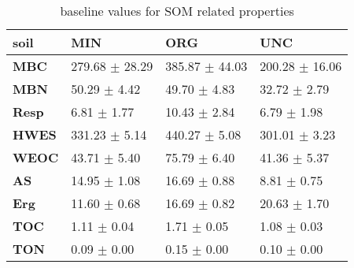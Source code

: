 \begin{table}[H]
\centering
\caption{baseline values for SOM related properties }
\label{baseline}
\begin{tabular}{llll}
\toprule
\textbf{soil} &              MIN &              ORG &              UNC \\
\midrule
\textbf{MBC } &  279.68 $ \pm $  28.29 &  385.87 $ \pm $  44.03 &  200.28 $ \pm $  16.06 \\
\textbf{MBN } &    50.29 $ \pm $  4.42 &    49.70 $ \pm $  4.83 &    32.72 $ \pm $  2.79 \\
\textbf{Resp} &     6.81 $ \pm $  1.77 &    10.43 $ \pm $  2.84 &     6.79 $ \pm $  1.98 \\
\textbf{HWES} &   331.23 $ \pm $  5.14 &   440.27 $ \pm $  5.08 &   301.01 $ \pm $  3.23 \\
\textbf{WEOC} &    43.71 $ \pm $  5.40 &    75.79 $ \pm $  6.40 &    41.36 $ \pm $  5.37 \\
\textbf{AS  } &    14.95 $ \pm $  1.08 &    16.69 $ \pm $  0.88 &     8.81 $ \pm $  0.75 \\
\textbf{Erg } &    11.60 $ \pm $  0.68 &    16.69 $ \pm $  0.82 &    20.63 $ \pm $  1.70 \\
\textbf{TOC } &     1.11 $ \pm $  0.04 &     1.71 $ \pm $  0.05 &     1.08 $ \pm $  0.03 \\
\textbf{TON } &     0.09 $ \pm $  0.00 &     0.15 $ \pm $  0.00 &     0.10 $ \pm $  0.00 \\
\bottomrule
\end{tabular}
\end{table}
